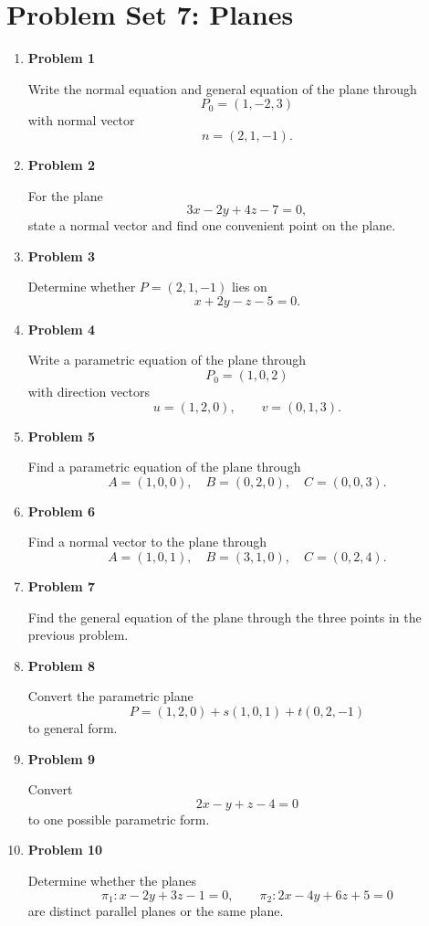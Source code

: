 \section{Problem Set 7: Planes}

\begin{enumerate}
\item \textbf{Problem 1}\par
Write the normal equation and general equation of the plane through
\[
P_0=(1,-2,3)
\]
with normal vector
\[
n=(2,1,-1).
\]

\item \textbf{Problem 2}\par
For the plane
\[
3x-2y+4z-7=0,
\]
state a normal vector and find one convenient point on the plane.

\item \textbf{Problem 3}\par
Determine whether \(P=(2,1,-1)\) lies on
\[
x+2y-z-5=0.
\]

\item \textbf{Problem 4}\par
Write a parametric equation of the plane through
\[
P_0=(1,0,2)
\]
with direction vectors
\[
u=(1,2,0),
\qquad
v=(0,1,3).
\]

\item \textbf{Problem 5}\par
Find a parametric equation of the plane through
\[
A=(1,0,0),\quad B=(0,2,0),\quad C=(0,0,3).
\]

\item \textbf{Problem 6}\par
Find a normal vector to the plane through
\[
A=(1,0,1),\quad B=(3,1,0),\quad C=(0,2,4).
\]

\item \textbf{Problem 7}\par
Find the general equation of the plane through the three points in the previous problem.

\item \textbf{Problem 8}\par
Convert the parametric plane
\[
P=(1,2,0)+s(1,0,1)+t(0,2,-1)
\]
to general form.

\item \textbf{Problem 9}\par
Convert
\[
2x-y+z-4=0
\]
to one possible parametric form.

\item \textbf{Problem 10}\par
Determine whether the planes
\[
\pi_1:x-2y+3z-1=0,
\qquad
\pi_2:2x-4y+6z+5=0
\]
are distinct parallel planes or the same plane.


\end{enumerate}
